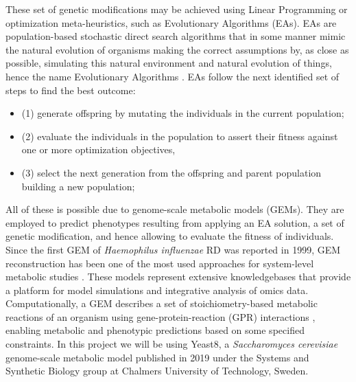 \documentclass[runningheads]{llncs}
\begin{document}
These set of genetic modifications may be achieved using Linear Programming or optimization meta-heuristics, such as Evolutionary Algorithms (EAs). EAs are population-based stochastic direct search algorithms that in some manner mimic the natural evolution of organisms making the correct assumptions by, as close as possible, simulating this natural environment and natural evolution of things, hence the name Evolutionary Algorithms \cite{bartz2014evolutionary}. EAs follow the next identified set of steps to find the best outcome:
\begin{itemize}
    \item (1) generate offspring by mutating the individuals in the current population;
    \item (2) evaluate the individuals in the population to assert their fitness against one or more optimization objectives,
    \item (3) select the next generation from the offspring and parent population building a new population;
\end{itemize}

All of these is possible due to genome-scale metabolic models (GEMs). They are employed to predict phenotypes resulting from applying an EA solution, a set of genetic modification, and hence allowing to evaluate the fitness of individuals. Since the first GEM of \emph{Haemophilus influenzae} RD was reported in 1999, GEM reconstruction has been one of the most used approaches for system-level metabolic studies \cite{edwards1999systems}. These models represent extensive knowledgebases that provide a platform for model simulations and integrative analysis of omics data. Computationally, a GEM describes a set of stoichiometry-based metabolic reactions of an organism using gene-protein-reaction (GPR) interactions \cite{gu2019current}, enabling metabolic and phenotypic predictions based on some specified constraints. In this project we will be using Yeast8, a \emph{Saccharomyces cerevisiae} genome-scale metabolic model published in 2019 \cite{lu2019consensus} under the Systems and Synthetic Biology group at Chalmers University of Technology, Sweden.
\end{document}

